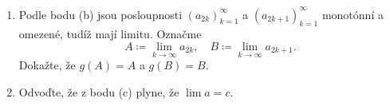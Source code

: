 \documentclass[a4paper,11pt]{article}
\begin{document}
\begin{tcolorbox}[breakable,title=\textsf{Těžké úlohy a důkazy (12
  bodů)},arc=0mm,boxsep=3mm,bottomrule=1pt,toprule=1pt,leftrule=-0.1mm,
  rightrule=-0.1mm,colframe=BrickRed!80!white,colback=BrickRed!5!white]
\begin{enumerate}
\begin{enumerate}
\begin{itemize}
      \item rovnice $g(x) = x$ má na intervalu $[0,1]$ přesně jedno řešení.
       Označme je $c$.
      \item platí $x < g(x) < c$ pro $x \in [0,c)$ a $c < g(x) < x$ pro $x \in
       (c,1]$.
      \item platí $a_2 < c < a_1$ a $g(a_k) = a_{k+2}$.
      \item podposloupnost lichých členů $a$ je klesající a zdola omezená a
       podposloupnost sudých členů je rostoucí a shora omezená.
     \end{itemize}
    \item Podle bodu (b) jsou posloupnosti $(a_{2k})_{k=1}^{\infty}$ a
     $(a_{2k+1})_{k=1}^{\infty}$ monotónní a omezené, tudíž mají limitu. Označme
     \[
      A \coloneqq \lim_{k \to \infty} a_{2k}, \quad B \coloneqq \lim_{k \to
      \infty} a_{2k+1}.
     \]
     Dokažte, že $g(A) = A$ a $g(B) = B$.
    \item Odvoďte, že z bodu (c) plyne, že $\lim a = c$.
   \end{enumerate}
  \end{enumerate}
 \end{tcolorbox}
\end{document}
